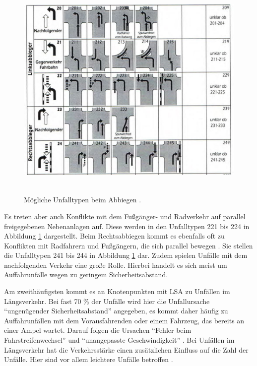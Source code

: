 \begin{savenotes}
	\begin{figure}[H]
		\centering
		\includegraphics[width=13cm,height=11cm]{figures/Abbiege-Unfall}
		\caption[Unfalltyp 2 Abbiege-Unfall]{Mögliche Unfalltypen beim Abbiegen \parencite[S. 11]{GesamtverbandderDeutschenVersicherungswirtschafte.V..2016}. }\label{fig:Abbiege-Unfall}
	\end{figure}
\end{savenotes}

Es treten aber auch Konflikte mit dem Fußgänger- und Radverkehr auf parallel freigegebenen Nebenanlagen auf. Diese werden in den Unfalltypen 221 bis 224 in Abbildung \ref{fig:Abbiege-Unfall} dargestellt. Beim Rechtsabbiegen kommt es ebenfalls oft zu Konflikten mit Radfahrern und Fußgängern, die sich parallel bewegen \parencite[S. 273]{Schreiber.2016}. Sie stellen die Unfalltypen 241 bis 244 in Abbildung \ref{fig:Abbiege-Unfall} dar. Zudem spielen Unfälle mit dem nachfolgenden Verkehr eine große Rolle. Hierbei handelt es sich meist um Auffahrunfälle wegen zu geringem Sicherheitsabstand.

Am zweithäufigsten kommt es an Knotenpunkten mit \ac{LSA} zu Unfällen im Längsverkehr. Bei fast 70 \% der Unfälle wird hier die Unfallursache \enquote{ungenügender Sicherheitsabstand} angegeben, es kommt daher häufig zu Auffahrunfällen mit dem Vorausfahrenden oder einem Fahrzeug, das bereits an einer Ampel wartet. Darauf folgen die Ursachen \enquote{Fehler beim Fahrstreifenwechsel} und \enquote{unangepasste Geschwindigkeit} \parencite[S. 273]{Schreiber.2016}. Bei Unfällen im Längsverkehr hat die Verkehrsstärke einen zusätzlichen Einfluss auf die Zahl der Unfälle. Hier sind vor allem leichtere Unfälle betroffen \parencite[S. 86]{Aurich.2015}. %

